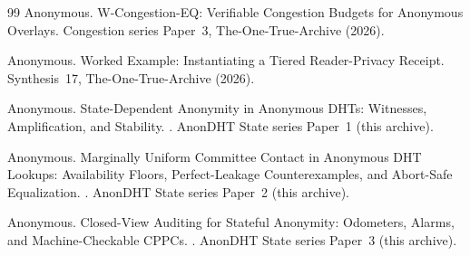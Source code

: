 \documentclass[11pt]{article}
\begin{document}
\begin{thebibliography}{99}
Anonymous.
\newblock W-Congestion-EQ: Verifiable Congestion Budgets for Anonymous Overlays.
\newblock Congestion series Paper~3, The-One-True-Archive (2026).

Anonymous.
\newblock Worked Example: Instantiating a Tiered Reader-Privacy Receipt.
\newblock Synthesis~17, The-One-True-Archive (2026).

Anonymous.
\newblock State-Dependent Anonymity in Anonymous DHTs: Witnesses, Amplification, and Stability.
.
\newblock AnonDHT State series Paper~1 (this archive).

Anonymous.
\newblock Marginally Uniform Committee Contact in Anonymous DHT Lookups: Availability Floors, Perfect-Leakage Counterexamples, and Abort-Safe Equalization.
.
\newblock AnonDHT State series Paper~2 (this archive).

Anonymous.
\newblock Closed-View Auditing for Stateful Anonymity: Odometers, Alarms, and Machine-Checkable CPPCs.
.
\newblock AnonDHT State series Paper~3 (this archive).

\end{thebibliography}
\end{document}
